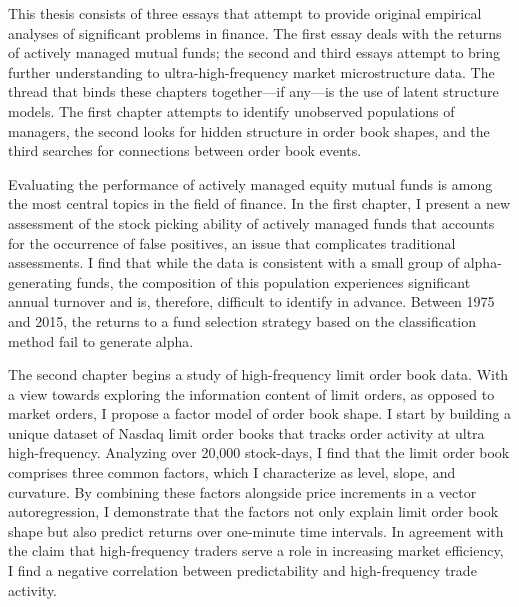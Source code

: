 This thesis consists of three essays that attempt to provide original empirical analyses of significant problems in finance. The first essay deals with the returns of actively managed mutual funds; the second and third essays attempt to bring further understanding to ultra-high-frequency market microstructure data. The thread that binds these chapters together---if any---is the use of latent structure models. The first chapter attempts to identify unobserved populations of managers, the second looks for hidden structure in order book shapes, and the third searches for connections between order book events.

Evaluating the performance of actively managed equity mutual funds is among the most central topics in the field of finance. In the first chapter, I present a new assessment of the stock picking ability of actively managed funds that accounts for the occurrence of false positives, an issue that complicates traditional assessments. I find that while the data is consistent with a small group of alpha-generating funds, the composition of this population experiences significant annual turnover and is, therefore, difficult to identify in advance. Between 1975 and 2015, the returns to a fund selection strategy based on the classification method fail to generate alpha.

The second chapter begins a study of high-frequency limit order book data. With a view towards exploring the information content of limit orders, as opposed to market orders, I propose a factor model of order book shape. I start by building a unique dataset of Nasdaq limit order books that tracks order activity at ultra high-frequency. Analyzing over 20,000 stock-days, I find that the limit order book comprises three common factors, which I characterize as level, slope, and curvature. By combining these factors alongside price increments in a vector autoregression, I demonstrate that the factors not only explain limit order book shape but also predict returns over one-minute time intervals. In agreement with the claim that high-frequency traders serve a role in increasing market efficiency, I find a negative correlation between predictability and high-frequency trade activity.

